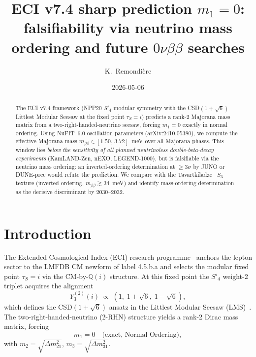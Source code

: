 \documentclass[aps,prl,twocolumn,showpacs,superscriptaddress]{revtex4-2}
\newcommand{\mbb}{m_{\beta\beta}}
\newcommand{\Qi}{\mathbb{Q}(i)}
\begin{document}
\title{ECI v7.4 sharp prediction $m_1 = 0$: falsifiability via neutrino
       mass ordering and future $0\nu\beta\beta$ searches}

\author{K.~Remondi\`{e}re}

\date{2026-05-06}

\begin{abstract}
The ECI v7.4 framework (NPP20 $S'_4$ modular symmetry with the
CSD$(1+\sqrt{6})$ Littlest Modular Seesaw at the fixed point
$\tau_S = i$) predicts a rank-2 Majorana mass matrix from a
two-right-handed-neutrino seesaw, forcing $m_1 = 0$ exactly in
normal ordering.  Using NuFIT~6.0 oscillation parameters
(arXiv:2410.05380), we compute the effective Majorana mass
$\mbb \in [1.50,\,3.72]$~meV over all Majorana phases.
This window lies \emph{below the sensitivity of all planned
neutrinoless double-beta-decay experiments} (KamLAND-Zen,
nEXO, LEGEND-1000), but is falsifiable via the neutrino mass
ordering: an inverted-ordering determination at $\geq 3\sigma$
by JUNO or DUNE-prec would refute the prediction.
We compare with the Tavartkiladze~\cite{Tav25} $S_3$ texture
(inverted ordering, $\mbb \gtrsim 34$~meV) and identify
mass-ordering determination as the decisive discriminant by
2030--2032.
\end{abstract}


\maketitle

\section{Introduction}
\label{sec:intro}

The Extended Cosmological Index (ECI) research
programme~\cite{ECIv6053} anchors the lepton sector to the
LMFDB CM newform of label 4.5.b.a and selects the modular fixed
point $\tau_S = i$ via the CM-by-$\Qi$ structure.  At this
fixed point the $S'_4$ weight-2 triplet acquires the
alignment~\cite{DKLL19}
\begin{equation}
  Y_3^{(2)}(i) \;\propto\; (1,\;1+\sqrt{6},\;1-\sqrt{6}),
\end{equation}
which defines the CSD$(1+\sqrt{6})$ ansatz in the Littlest
Modular Seesaw (LMS)~\cite{LMS22}.  The two-right-handed-neutrino
(2-RHN) structure yields a rank-2 Dirac mass matrix, forcing
\begin{equation}
  m_1 = 0 \quad\text{(exact, Normal Ordering)},
  \label{eq:m1zero}
\end{equation}
with $m_2 = \sqrt{\Delta m^2_{21}}$,
$m_3 = \sqrt{\Delta m^2_{31}}$.
\end{document}
